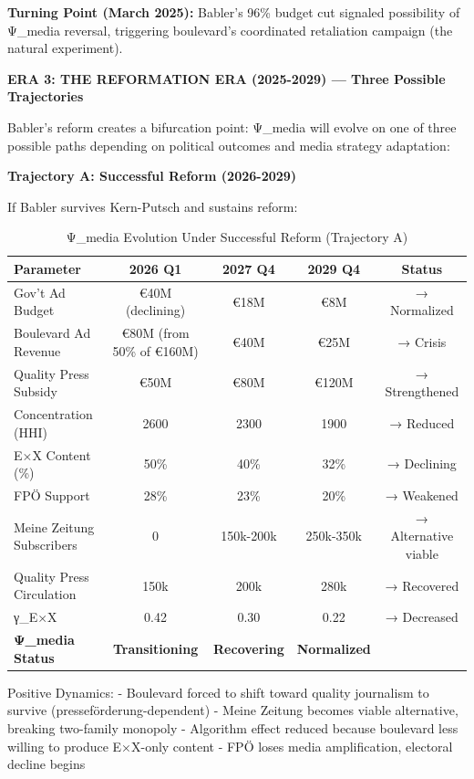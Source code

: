 \textbf{Turning Point (March 2025):} Babler's 96\% budget cut signaled possibility of Ψ_media reversal,
triggering boulevard's coordinated retaliation campaign (the natural experiment).

\vspace{0.3cm}

\textbf{ERA 3: THE REFORMATION ERA (2025-2029) — Three Possible Trajectories}

Babler's reform creates a bifurcation point: Ψ_media will evolve on one of three possible paths
depending on political outcomes and media strategy adaptation:

\textbf{Trajectory A: Successful Reform (2026-2029)}

If Babler survives Kern-Putsch and sustains reform:

\begin{table}[h]
\centering
\caption{Ψ_media Evolution Under Successful Reform (Trajectory A)}
\label{tab:dx-psi-trajectory-a}
\begin{tabular}{|l|c|c|c|c|}
\hline
\textbf{Parameter} & \textbf{2026 Q1} & \textbf{2027 Q4} & \textbf{2029 Q4} & \textbf{Status} \\
\hline
Gov't Ad Budget & €40M (declining) & €18M & €8M & → Normalized \\
Boulevard Ad Revenue & €80M (from 50\% of €160M) & €40M & €25M & → Crisis \\
Quality Press Subsidy & €50M & €80M & €120M & → Strengthened \\
Concentration (HHI) & 2600 & 2300 & 1900 & → Reduced \\
E×X Content (\%) & 50\% & 40\% & 32\% & → Declining \\
FPÖ Support & 28\% & 23\% & 20\% & → Weakened \\
Meine Zeitung Subscribers & 0 & 150k-200k & 250k-350k & → Alternative viable \\
Quality Press Circulation & 150k & 200k & 280k & → Recovered \\
γ_{E×X} & 0.42 & 0.30 & 0.22 & → Decreased \\
\hline
\textbf{Ψ_media Status} & \textbf{Transitioning} & \textbf{Recovering} & \textbf{Normalized} & \\
\hline
\end{tabular}
\end{table}

Positive Dynamics:
- Boulevard forced to shift toward quality journalism to survive (presseförderung-dependent)
- Meine Zeitung becomes viable alternative, breaking two-family monopoly
- Algorithm effect reduced because boulevard less willing to produce E×X-only content
- FPÖ loses media amplification, electoral decline begins

